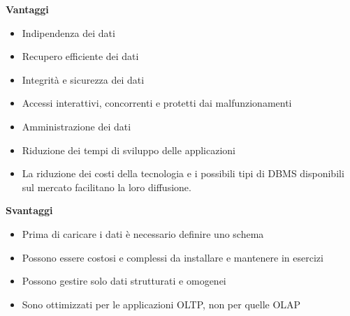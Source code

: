 \noindent \textbf{Vantaggi}
\begin{itemize}
	\item Indipendenza dei dati
	\item Recupero efficiente dei dati
	\item Integrità e sicurezza dei dati
	\item Accessi interattivi, concorrenti e protetti dai malfunzionamenti
	\item Amministrazione dei dati
	\item Riduzione dei tempi di sviluppo delle applicazioni
	\item La riduzione dei costi della tecnologia e i possibili tipi di DBMS disponibili sul mercato facilitano la loro diffusione.
\end{itemize}
\textbf{Svantaggi}
\begin{itemize}
	\item Prima di caricare i dati è necessario definire uno schema
	\item Possono essere costosi e complessi da installare e mantenere in esercizi
	\item Possono gestire solo dati strutturati e omogenei
	\item Sono ottimizzati per le applicazioni OLTP, non per quelle OLAP
\end{itemize}

